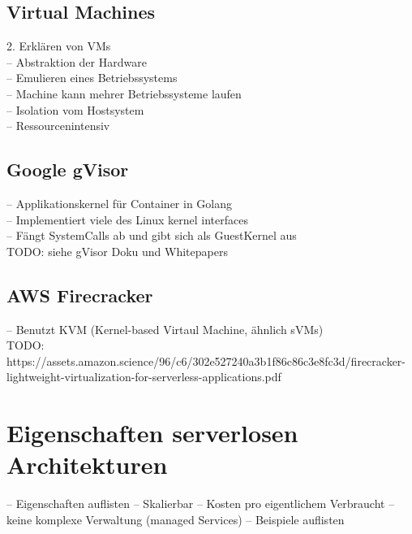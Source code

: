 \subsection{Virtual Machines}
2. Erklären von VMs\\
-- Abstraktion der Hardware\\
-- Emulieren eines Betriebssystems\\
-- Machine kann mehrer Betriebssysteme laufen\\
-- Isolation vom Hostsystem\\
-- Ressourcenintensiv\\

\subsection{Google gVisor}
-- Applikationskernel für Container in Golang\\
-- Implementiert viele des Linux kernel interfaces\\
-- Fängt SystemCalls ab und gibt sich als GuestKernel aus\\
TODO: siehe gVisor Doku und Whitepapers\\


\subsection{AWS Firecracker}
-- Benutzt KVM (Kernel-based Virtaul Machine, ähnlich sVMs)\\
TODO: https://assets.amazon.science/96/c6/302e527240a3b1f86c86c3e8fc3d/firecracker-lightweight-virtualization-for-serverless-applications.pdf

\section{Eigenschaften serverlosen Architekturen}
-- Eigenschaften auflisten
-- Skalierbar
-- Kosten pro eigentlichem Verbraucht
-- keine komplexe Verwaltung (managed Services)
-- Beispiele auflisten